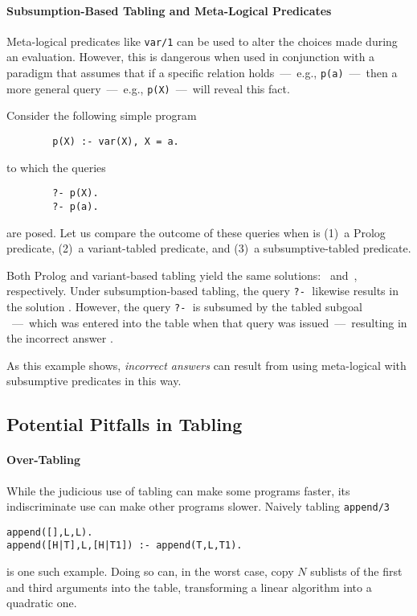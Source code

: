 \paragraph{Subsumption-Based Tabling and Meta-Logical Predicates}

Meta-logical predicates like {\tt var/1} can be used to alter the
choices made during an evaluation.  However, this is dangerous when
used in conjunction with a paradigm that assumes that if a specific
relation holds~---~e.g., \texttt{p(a)}~---~then a more general
query~---~e.g., \texttt{p(X)}~---~will reveal this fact.

\begin{example}\label{example:sub-fail}
Consider the following simple program
\begin{verbatim}
        p(X) :- var(X), X = a.
\end{verbatim}
to which the queries
\begin{verbatim}
        ?- p(X).
        ?- p(a).
\end{verbatim}
are posed.  Let us compare the outcome of these queries when
 is (1)~a Prolog predicate, (2)~a variant-tabled predicate,
and (3)~a subsumptive-tabled predicate.

Both Prolog and variant-based tabling yield the same solutions: \, and\, , respectively.  Under subsumption-based tabling,
the query \verb|?-|$\;$ likewise results in the solution
.  However, the query \verb|?-|$\;$  is subsumed
by the tabled subgoal ~---~which was entered into the table
when that query was issued~---~resulting in the incorrect answer
.\fillBox
\end{example}
%
As this example shows, \emph{incorrect answers} can result from using
meta-logical with subsumptive predicates in this way.


\subsection{Potential Pitfalls in Tabling}
\label{sec:TablingPitfalls}

\paragraph{Over-Tabling}
While the judicious use of tabling can make some programs faster, its
indiscriminate use can make other programs slower.  Naively tabling
{\tt append/3}
\begin{center}
\begin{minipage}{3.5in}
\begin{verbatim}
append([],L,L).
append([H|T],L,[H|T1]) :- append(T,L,T1).
\end{verbatim}						       
\end{minipage}
\end{center}
is one such example.  Doing so can, in the worst case, copy $N$
sublists of the first and third arguments into the table, transforming
a linear algorithm into a quadratic one.

